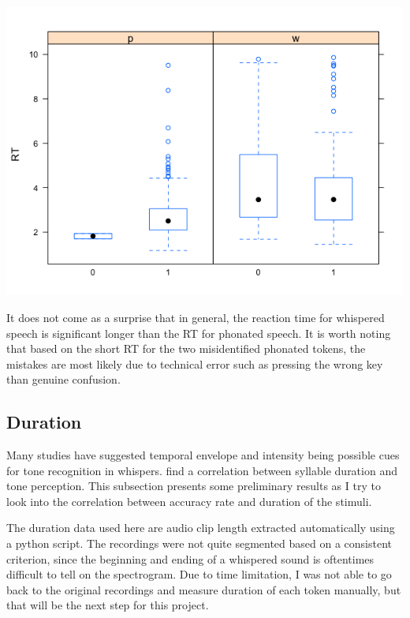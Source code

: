 \documentclass[12pt,letterpaper]{scrartcl}
\begin{document}
\begin{center}
	\includegraphics[scale=0.45]{RT}
\end{center}

It does not come as a surprise that in general, the reaction time for whispered speech is significant longer than the RT for phonated speech. It is worth noting that based on the short RT for the two misidentified phonated tokens, the mistakes are most likely due to technical error such as pressing the wrong key than genuine confusion.


\subsection{Duration}

Many studies have suggested temporal envelope and intensity being possible cues for tone recognition in whispers. \cite{liu.samuel2004PerceptionMandarinLexical} find a correlation between syllable duration and tone perception. This subsection presents some preliminary results as I try to look into the correlation between accuracy rate and duration of the stimuli.

The duration data used here are audio clip length extracted automatically using a python script. The recordings were not quite segmented based on a consistent criterion, since the beginning and ending of a whispered sound is oftentimes difficult to tell on the spectrogram. Due to time limitation, I was not able to go back to the original recordings and measure duration of each token manually, but that will be the next step for this project.
\end{document}

